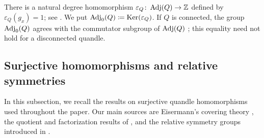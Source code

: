

There is a natural degree homomorphism $\varepsilon_{Q}\colon\operatorname{Adj}(Q)\to\mathbb Z$ defined by $\varepsilon_{Q}(g_{x})=1$; see \cite[Definition~2.33]{eisermann_2014_quandle_coverings_and_their_galois_correspondence}. We put $\operatorname{Adj}_0(Q)\coloneqq \operatorname{Ker}(\varepsilon_{Q})$. If $Q$ is connected, the group $\operatorname{Adj}_0(Q)$ agrees with the commutator subgroup of $\operatorname{Adj}(Q)$ \cite[Remark~2.34]{eisermann_2014_quandle_coverings_and_their_galois_correspondence}; this equality need not hold for a disconnected quandle.



\subsection{Surjective homomorphisms and relative symmetries}
\label{subsection: quandle homomorphisms}

In this subsection, we recall the results on surjective quandle homomorphisms used throughout the paper. Our main sources are Eisermann's covering theory \cite{eisermann_2014_quandle_coverings_and_their_galois_correspondence}, the quotient and factorization results of \cite{bunch_lofgren_rapp_yetter_2010_on_quotients_of_quandles,even_gran_2014_on_factorization_systems_for_surjective_quandle_homomorphisms}, and the relative symmetry groups introduced in \cite{preprint_yuki_tomoki_2026_relativization_of_symmetries_on_quandles}.

